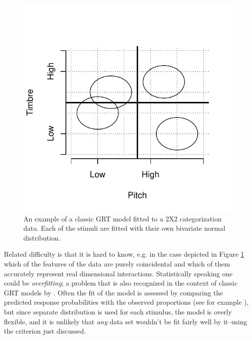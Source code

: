 \documentclass{article}\usepackage{knitr}
\begin{document}
\begin{figure}[!htb]
\centering
\begin{knitrout}
\color{fgcolor}
\includegraphics[width=\maxwidth]{figure/unnamed-chunk-11-1} 

\end{knitrout}
\caption{An example of a classic GRT model fitted to a 2X2 categorization data. Each of the stimuli are fitted with their own bivariate normal distribution.}
\label{fig:classicGRT}
\end{figure} 

Related difficulty is that it is hard to know, e.g. in the case depicted in Figure \ref{fig:classicGRT} which of the features of the data are purely coincidental and which of them accurately represent real dimensional interactions. Statistically speaking one could be \textit{overfitting}; a problem that is also recognized in the context of classic GRT models by \cite{soto2017}. Often the fit of the model is assessed by comparing the predicted response probabilities with the observed proportions (see for example \citet[Figure 4]{silbert2009}), but since separate distribution is used for each stimulus, the model is overly flexible, and it is unlikely that \textit{any} data set wouldn't be fit fairly well by it--using the criterion just discussed.
\end{document}
